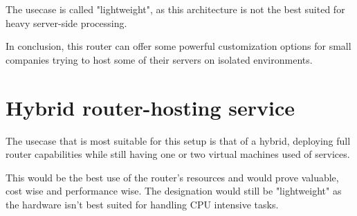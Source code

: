 The usecase is called "lightweight", as this architecture
is not the best suited for heavy server-side processing.

In conclusion, this router can offer some powerful customization options
for small companies trying to host some of their servers on isolated
environments.

\section{Hybrid router-hosting service}
\label{sec:hybrid}
The usecase that is most suitable for this setup is that of a hybrid,
deploying full router capabilities while still having one or two virtual
machines used of services.

This would be the best use of the router's resources and would prove valuable,
cost wise and performance wise. The designation would still be "lightweight"
as the hardware isn't best suited for handling CPU intensive tasks.
